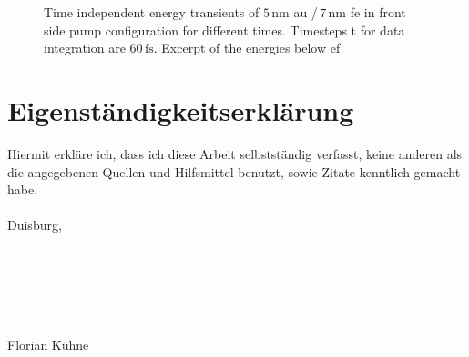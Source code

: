 \documentclass[a4paper,12pt,twoside]{article}
\begin{document}
			\begin{figure}[H]
		\caption{Time independent energy transients of $5\,\mathrm{\mbox{nm}}$ \gls{au} /\,$7\,\mathrm{\mbox{nm}}$ \gls{fe} in front side pump configuration for different times. Timesteps \textDelta t for data integration are $60\,\mathrm{fs}$. Excerpt of the energies below \gls{ef}}
    		\label{transients9}
	\end{figure}
    \newpage


\section*{Eigenständigkeitserklärung}

Hiermit erkläre ich, dass ich diese Arbeit selbstständig verfasst, keine anderen als die angegebenen Quellen und Hilfsmittel benutzt, sowie Zitate kenntlich gemacht habe.
\\
\\
Duisburg, \date{\today}
\\
\\
\\
\\
\\
Florian Kühne
\end{document}
